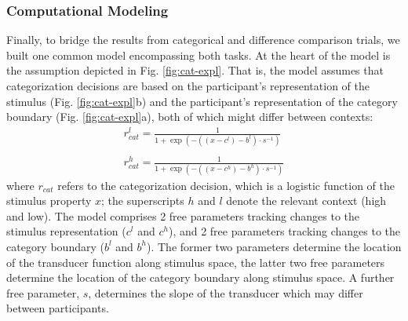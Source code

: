 \documentclass[a4paper, nobind]{templates/ociamthesis}
\begin{document}
\hypertarget{computational-modeling-2}{%
\subsubsection{Computational Modeling}\label{computational-modeling-2}}

Finally, to bridge the results from categorical and difference comparison trials, we built one common model encompassing both tasks. At the heart of the model is the assumption depicted in Fig. \ref{fig:cat-expl}. That is, the model assumes that categorization decisions are based on the participant's representation of the stimulus (Fig. \ref{fig:cat-expl}b) and the participant's representation of the category boundary (Fig. \ref{fig:cat-expl}a), both of which might differ between contexts:
\begin{equation}
\begin{aligned}
r_{cat}^l = \frac{1}{1+\exp(-((x-c^l)-b^l) \cdot s^{-1})}\\
\\
r_{cat}^h = \frac{1}{1+\exp(-((x-c^h)-b^h) \cdot s^{-1})}
\end{aligned}
\end{equation}
where \(r_{cat}\) refers to the categorization decision, which is a logistic function of the stimulus property \(x\); the superscripts \(h\) and \(l\) denote the relevant context (high and low). The model comprises 2 free parameters tracking changes to the stimulus representation (\(c^l\) and \(c^h\)), and 2 free parameters tracking changes to the category boundary (\(b^l\) and \(b^h\)). The former two parameters determine the location of the transducer function along stimulus space, the latter two free parameters determine the location of the category boundary along stimulus space. A further free parameter, \(s\), determines the slope of the transducer which may differ between participants.
\end{document}

